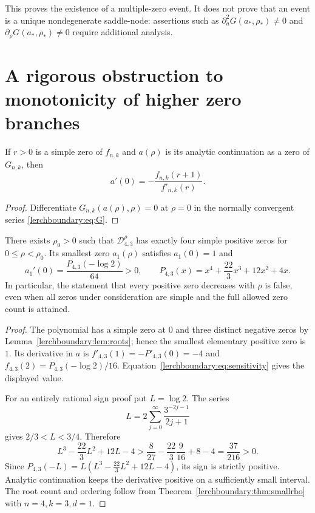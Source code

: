 This proves the existence of a multiple-zero event.  It does not prove
that an event is a unique nondegenerate saddle-node: assertions such as
$\partial_a^2G(a_*,\rho_*)\neq0$ and
$\partial_\rho G(a_*,\rho_*)\neq0$ require additional analysis.

\section{A rigorous obstruction to monotonicity of higher zero branches}
\label{lerchboundary:sec:monotonicity}

\begin{proposition}
\label{lerchboundary:prop:sensitivity}
If $r>0$ is a simple zero of $f_{n,k}$ and $a(\rho)$ is its analytic
continuation as a zero of $G_{n,k}$, then
\begin{equation}\label{lerchboundary:eq:sensitivity}
 a'(0)=-\frac{f_{n,k}(r+1)}{f'_{n,k}(r)}.
\end{equation}
\end{proposition}

\begin{proof}
Differentiate $G_{n,k}(a(\rho),\rho)=0$ at $\rho=0$ in the normally
convergent series \eqref{lerchboundary:eq:G}.
\end{proof}

\begin{theorem}
\label{lerchboundary:thm:counterexample}
There exists $\rho_0>0$ such that $\mathcal D_{4,3}^{\rho}$ has exactly
four simple positive zeros for $0\leq\rho<\rho_0$. Its smallest zero
$a_1(\rho)$ satisfies $a_1(0)=1$ and
\begin{equation}\label{lerchboundary:eq:counterexample}
 a_1'(0)=\frac{P_{4,3}(-\log2)}{64}>0,
 \qquad P_{4,3}(x)=x^4+\frac{22}{3}x^3+12x^2+4x.
\end{equation}
In particular, the statement that every positive zero decreases with
$\rho$ is false, even when all zeros under consideration are simple
and the full allowed zero count is attained.
\end{theorem}

\begin{proof}
The polynomial has a simple zero at $0$ and three distinct negative
zeros by Lemma~\ref{lerchboundary:lem:roots}; hence the smallest
elementary positive zero is $1$. Its derivative in $a$ is
$f'_{4,3}(1)=-P'_{4,3}(0)=-4$ and
$f_{4,3}(2)=P_{4,3}(-\log2)/16$.
Equation~\eqref{lerchboundary:eq:sensitivity} gives the displayed value.

For an entirely rational sign proof put $L=\log2$.  The series
\[
 L=2\sum_{j=0}^{\infty}\frac{3^{-2j-1}}{2j+1}
\]
gives $2/3<L<3/4$. Therefore
\[
 L^3-\frac{22}{3}L^2+12L-4
 >\frac8{27}-\frac{22}{3}\frac9{16}+8-4
 =\frac{37}{216}>0.
\]
Since $P_{4,3}(-L)=L(L^3-\tfrac{22}{3}L^2+12L-4)$, its sign is
strictly positive.  Analytic continuation keeps the derivative
positive on a sufficiently small interval.  The root count and
ordering follow from Theorem~\ref{lerchboundary:thm:smallrho} with
$n=4,k=3,d=1$.
\end{proof}

